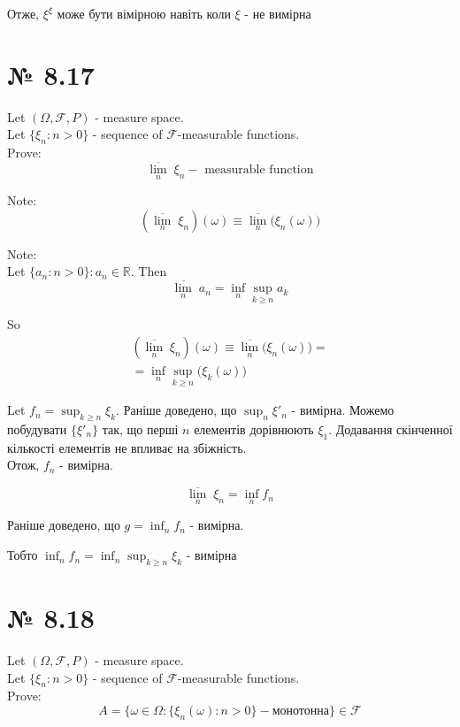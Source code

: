 \documentclass[11pt, a4paper]{article} %
\begin{document}
\begin{mdframed}[style=ans]
    Отже, $\xi^\xi$ може бути вімірною навіть коли $\xi$ - не вимірна
\end{mdframed}


\section*{№ 8.17}
\begin{mdframed}
    Let $(\Omega, \mathcal F, P)$ - measure space.\\
    Let $\{\xi_n : n>0\}$ - sequence of $\mathcal F$-measurable functions.\\
    Prove:
    $$\overline{\lim_n}\;\xi_n - \text{ measurable function}$$
\end{mdframed}

\begin{mdframed}
    Note:
    $$\left(\overline{\lim_n}\; \xi_n\right)(\omega) \equiv \overline{\lim_n}\bigl(\xi_n(\omega)\bigr)$$
\end{mdframed}

\begin{mdframed}
    Note:\\
    Let $\{a_n : n>0\} : a_n \in \mathbb R$. Then
    $$\overline{\lim_n}\; a_n = \inf_n \sup_{k \ge n} a_k$$
\end{mdframed}

So
$$
\begin{gathered}
    \left(\overline{\lim_n}\; \xi_n\right)(\omega) \equiv \overline{\lim_n}\bigl(\xi_n(\omega)\bigr) = \\
    = \inf_n \sup_{k\ge n} \bigl(\xi_k(\omega)\bigr)
\end{gathered}
$$

Let $\displaystyle f_n = \sup_{k\ge n} \xi_k$. 
Раніше доведено, що $\displaystyle \sup_n \xi'_n$ - вимірна. 
Можемо побудувати $\{\xi'_n\}$ так, що перші $n$ елементів дорівнюють $\xi_1$.
Додавання скінченної кількості елементів не впливає на збіжність.\\
Отож, $f_n$ - вимірна.

$$\overline{\lim_n}\;\xi_n = \inf_n f_n$$

Раніше доведено, що $g = \displaystyle \inf_n f_n$ - вимірна.

Тобто $\displaystyle \inf_n f_n = \inf_n \sup_{k \ge n} \xi_k$ - вимірна

\section*{№ 8.18}
\begin{mdframed}
    Let $(\Omega, \mathcal F, P)$ - measure space.\\
    Let $\{\xi_n : n>0\}$ - sequence of $\mathcal F$-measurable functions.\\
    Prove:
    $$A = \{\omega\in\Omega : \{\xi_n(\omega) : n>0\} - \text{монотонна}\} \in \mathcal F$$
\end{mdframed}
\end{document}
